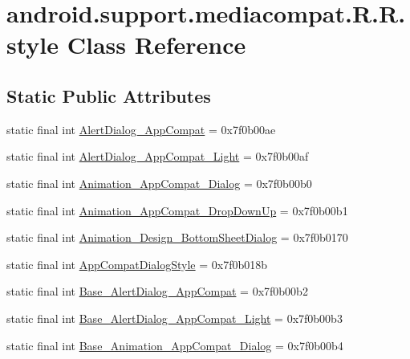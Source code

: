 \hypertarget{classandroid_1_1support_1_1mediacompat_1_1_r_1_1style}{
\section{android.support.mediacompat.R.R.style Class Reference}
\label{classandroid_1_1support_1_1mediacompat_1_1_r_1_1style}
}
\subsection*{Static Public Attributes}
\begin{CompactItemize}
\item 
static final int \hyperlink{classandroid_1_1support_1_1mediacompat_1_1_r_1_1style_c6209b0a89a1568340e9e46e5691fd0a}{AlertDialog\_\-AppCompat} = 0x7f0b00ae
\item 
static final int \hyperlink{classandroid_1_1support_1_1mediacompat_1_1_r_1_1style_5a89fc2bad2ce1226a87993a724dac00}{AlertDialog\_\-AppCompat\_\-Light} = 0x7f0b00af
\item 
static final int \hyperlink{classandroid_1_1support_1_1mediacompat_1_1_r_1_1style_8c99970c8109548c026dd3465e453604}{Animation\_\-AppCompat\_\-Dialog} = 0x7f0b00b0
\item 
static final int \hyperlink{classandroid_1_1support_1_1mediacompat_1_1_r_1_1style_12ba70b9c223936b887ff70297390ed8}{Animation\_\-AppCompat\_\-DropDownUp} = 0x7f0b00b1
\item 
static final int \hyperlink{classandroid_1_1support_1_1mediacompat_1_1_r_1_1style_c364d6aead718f373700dc514eff4949}{Animation\_\-Design\_\-BottomSheetDialog} = 0x7f0b0170
\item 
static final int \hyperlink{classandroid_1_1support_1_1mediacompat_1_1_r_1_1style_56d7c783fa8ae1e040ebaa749ec99c58}{AppCompatDialogStyle} = 0x7f0b018b
\item 
static final int \hyperlink{classandroid_1_1support_1_1mediacompat_1_1_r_1_1style_f23ef83666229aab0698a2dee9c7a6ed}{Base\_\-AlertDialog\_\-AppCompat} = 0x7f0b00b2
\item 
static final int \hyperlink{classandroid_1_1support_1_1mediacompat_1_1_r_1_1style_c30e496ca380b346f3a922e55199deac}{Base\_\-AlertDialog\_\-AppCompat\_\-Light} = 0x7f0b00b3
\item 
static final int \hyperlink{classandroid_1_1support_1_1mediacompat_1_1_r_1_1style_14af3bf6fd58aac7dc2ec8be06bf4e23}{Base\_\-Animation\_\-AppCompat\_\-Dialog} = 0x7f0b00b4

\end{CompactItemize}
